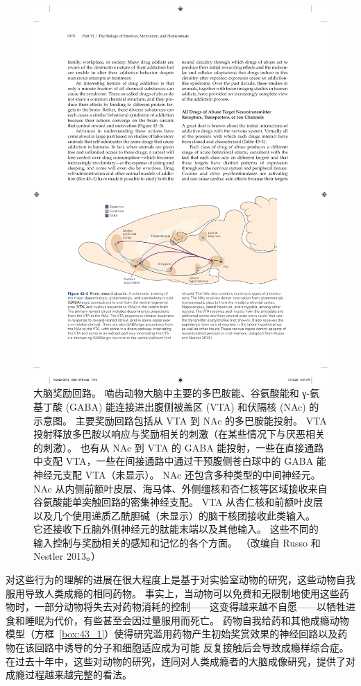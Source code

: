 \begin{figure}[htbp]
	\centering
	\includegraphics[width=0.9\linewidth]{chap43/fig_43_3}
	\caption{大脑奖励回路。 啮齿动物大脑中主要的多巴胺能、谷氨酸能和 γ-氨基丁酸 (GABA) 能连接进出腹侧被盖区 (VTA) 和伏隔核 (NAc) 的示意图。 主要奖励回路包括从 VTA 到 NAc 的多巴胺能投射。 VTA 投射释放多巴胺以响应与奖励相关的刺激（在某些情况下与厌恶相关的刺激）。 也有从 NAc 到 VTA 的 GABA 能投射，一些在直接通路中支配 VTA，一些在间接通路中通过干预腹侧苍白球中的 GABA 能神经元支配 VTA（未显示）。 NAc 还包含多种类型的中间神经元。 NAc 从内侧前额叶皮层、海马体、外侧缰核和杏仁核等区域接收来自谷氨酸能单突触回路的密集神经支配。 VTA 从杏仁核和前额叶皮层以及几个使用递质乙酰胆碱（未显示）的脑干核团接收此类输入。 它还接收下丘脑外侧神经元的肽能末端以及其他输入。 这些不同的输入控制与奖励相关的感知和记忆的各个方面。 （改编自 Russo 和 Nestler 2013。）}
	\label{fig:43_3}
\end{figure}


对这些行为的理解的进展在很大程度上是基于对实验室动物的研究，这些动物自我服用导致人类成瘾的相同药物。
事实上，当动物可以免费和无限制地使用这些药物时，一部分动物将失去对药物消耗的控制——这变得越来越不自愿——以牺牲进食和睡眠为代价，有些甚至会因过量服用而死亡。
药物自我给药和其他成瘾动物模型（方框~\ref{box:43_1}）使得研究滥用药物产生初始奖赏效果的神经回路以及药物在该回路中诱导的分子和细胞适应成为可能 反复接触后会导致成瘾样综合症。
在过去十年中，这些对动物的研究，连同对人类成瘾者的大脑成像研究，提供了对成瘾过程越来越完整的看法。


